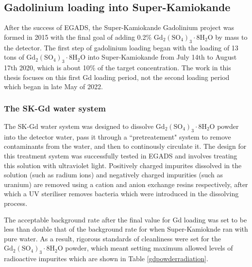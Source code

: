 \subsection{Gadolinium loading into Super-Kamiokande}

After the success of EGADS, the Super-Kamiokande Gadolinium project was formed in 2015 with the final goal of adding 0.2\% $\mathrm{Gd}_{2}\left(\mathrm{SO}_{4}\right)_{3} \cdot 8 \mathrm{H}_{2} \mathrm{O}$ by mass to the detector. The first step of gadolinium loading began with the loading of 13 tons of $\mathrm{Gd}_{2}\left(\mathrm{SO}_{4}\right)_{3} \cdot 8 \mathrm{H}_{2} \mathrm{O}$ into Super-Kamiokande from July 14th to August 17th 2020, which is about 10\% of the target concentration. The work in this thesis focuses on this first Gd loading period, not the second loading period which began in late May of 2022. 

\subsubsection{The SK-Gd water system}

The SK-Gd water system was designed to dissolve $\mathrm{Gd}_{2}\left(\mathrm{SO}_{4}\right)_{3} \cdot 8 \mathrm{H}_{2} \mathrm{O}$ powder into the detector water, pass it through a ``pretreatement" system to remove contaminants from the water, and then to continously circulate it. The design for this treatment system was successfully tested in EGADS and involves treating this solution with ultraviolet light. Positively charged impurites dissolved in the solution (such as radium ions) and negatively charged impurities (such as uranium) are removed using a cation and anion exchange resins respectively, after which a UV steriliser removes bacteria which were introduced in the dissolving process. 

The acceptable background rate after the final value for Gd loading  was set to be less than double that of the background rate for when Super-Kamioknde ran with pure water. As a result, rigorous standards of cleanliness were set for the $\mathrm{Gd}_{2}\left(\mathrm{SO}_{4}\right)_{3} \cdot 8 \mathrm{H}_{2} \mathrm{O}$ powder, which meant setting maximum allowed levels of radioactive impurites which are shown in Table \ref{gdpowderradiation}.


